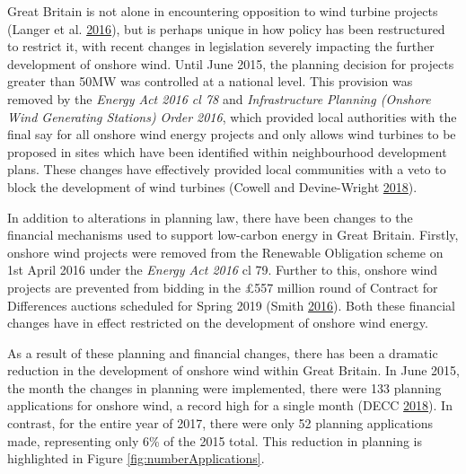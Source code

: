 \documentclass[a4paper,]{article}
\theoremstyle{definition}
\theoremstyle{definition}
\theoremstyle{definition}
\theoremstyle{remark}
\begin{document}
Great Britain is not alone in encountering opposition to wind turbine
projects (Langer et al. \protect\hyperlink{ref-Langer2016}{2016}), but
is perhaps unique in how policy has been restructured to restrict it,
with recent changes in legislation severely impacting the further
development of onshore wind. Until June 2015, the planning decision for
projects greater than 50MW was controlled at a national level. This
provision was removed by the \emph{Energy Act 2016 cl 78} and
\emph{Infrastructure Planning (Onshore Wind Generating Stations) Order
2016}, which provided local authorities with the final say for all
onshore wind energy projects and only allows wind turbines to be
proposed in sites which have been identified within neighbourhood
development plans. These changes have effectively provided local
communities with a veto to block the development of wind turbines
(Cowell and Devine-Wright \protect\hyperlink{ref-Cowell2018}{2018}).

In addition to alterations in planning law, there have been changes to
the financial mechanisms used to support low-carbon energy in Great
Britain. Firstly, onshore wind projects were removed from the Renewable
Obligation scheme on 1st April 2016 under the \emph{Energy Act 2016} cl
79. Further to this, onshore wind projects are prevented from bidding in
the £557 million round of Contract for Differences auctions scheduled
for Spring 2019 (Smith \protect\hyperlink{ref-Smith2016}{2016}). Both
these financial changes have in effect restricted on the development of
onshore wind energy.

As a result of these planning and financial changes, there has been a
dramatic reduction in the development of onshore wind within Great
Britain. In June 2015, the month the changes in planning were
implemented, there were 133 planning applications for onshore wind, a
record high for a single month (DECC
\protect\hyperlink{ref-DECC2018}{2018}). In contrast, for the entire
year of 2017, there were only 52 planning applications made,
representing only 6\% of the 2015 total. This reduction in planning is
highlighted in Figure \ref{fig:numberApplications}.
\end{document}
